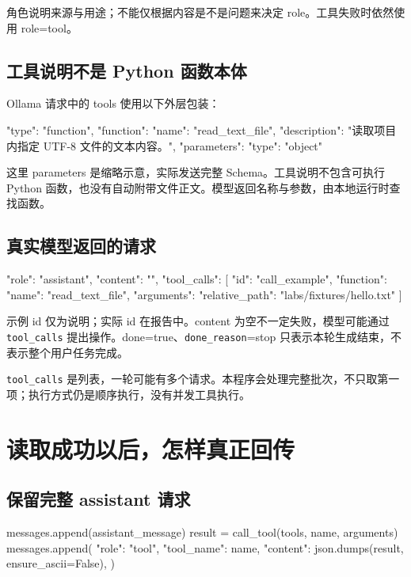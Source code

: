 \documentclass[UTF8,zihao=-4,fontset=fandol]{ctexart}
\begin{document}
角色说明来源与用途；不能仅根据内容是不是问题来决定 role。工具失败时依然使用 role=tool。

\subsection{工具说明不是 Python 函数本体}

Ollama 请求中的 tools 使用以下外层包装：

\begin{Code}
{
  "type": "function",
  "function": {
    "name": "read_text_file",
    "description": "读取项目内指定 UTF-8 文件的文本内容。",
    "parameters": {"type": "object"}
  }
}
\end{Code}

这里 parameters 是缩略示意，实际发送完整 Schema。工具说明不包含可执行 Python 函数，也没有自动附带文件正文。模型返回名称与参数，由本地运行时查找函数。

\subsection{真实模型返回的请求}

\begin{Code}
{
  "role": "assistant",
  "content": "",
  "tool_calls": [{
    "id": "call_example",
    "function": {
      "name": "read_text_file",
      "arguments": {"relative_path": "labs/fixtures/hello.txt"}
    }
  }]
}
\end{Code}

示例 id 仅为说明；实际 id 在报告中。content 为空不一定失败，模型可能通过 \nolinkurl{tool_calls} 提出操作。done=true、\nolinkurl{done_reason}=stop 只表示本轮生成结束，不表示整个用户任务完成。

\nolinkurl{tool_calls} 是列表，一轮可能有多个请求。本程序会处理完整批次，不只取第一项；执行方式仍是顺序执行，没有并发工具执行。

\section{读取成功以后，怎样真正回传}

\subsection{保留完整 assistant 请求}

\begin{Code}
messages.append(assistant_message)
result = call_tool(tools, name, arguments)
messages.append({
    "role": "tool",
    "tool_name": name,
    "content": json.dumps(result, ensure_ascii=False),
})
\end{Code}
\end{document}
